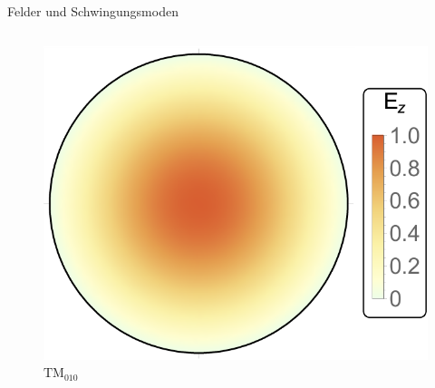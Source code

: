 \documentclass[12pt,xcolor=dvipsnames,professionalfonts]{beamer}
\begin{document}
\begin{frame}{Felder und Schwingungsmoden}
\begin{itemize}
	\end{itemize}
\end{frame}

\begin{frame}
	\begin{columns}[T]
		\begin{figure}[h]
			\centering
			\hspace*{0.70cm}\includegraphics[scale=0.4]{./figures/tm010.pdf}
			\vspace*{-0.2cm}
			\caption{$\mathrm{TM}_{010}$}
		\end{figure}
		

\end{columns}
\end{frame}
\end{document}
